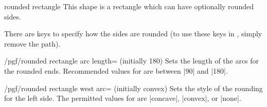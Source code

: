 \begin{shape}{rounded rectangle}
    This shape is a rectangle which can have optionally rounded sides.
\begin{codeexample}[preamble={\usetikzlibrary{shapes.misc}}]
\end{codeexample}

    There are keys to specify how the sides are rounded (to use these keys in
    \tikzname, simply remove the  path).

    \begin{key}{/pgf/rounded rectangle arc length= (initially 180)}
        Sets the length of the arcs for the rounded ends. Recommended values
        for  are between |90| and |180|.
\begin{codeexample}[preamble={\usetikzlibrary{shapes.misc}}]
\end{codeexample}
    \end{key}

    \begin{key}{/pgf/rounded rectangle west arc= (initially convex)}
        Sets the style of the rounding for the left side. The permitted values
        for  are |concave|, |convex|, or |none|.
\begin{codeexample}[preamble={\usetikzlibrary{shapes.misc}}]
\end{codeexample}
    \end{key}


\end{shape}
